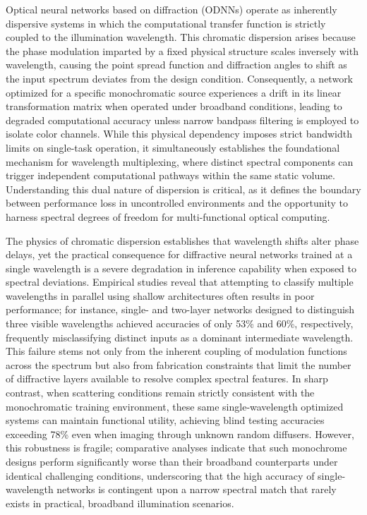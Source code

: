 Optical neural networks based on diffraction (ODNNs) operate as inherently dispersive systems in which the computational transfer function is strictly coupled to the illumination wavelength. This chromatic dispersion arises because the phase modulation imparted by a fixed physical structure scales inversely with wavelength, causing the point spread function and diffraction angles to shift as the input spectrum deviates from the design condition. \citep{doi_10_1117_1_oe_65_5_058106_f60e3d89} Consequently, a network optimized for a specific monochromatic source experiences a drift in its linear transformation matrix when operated under broadband conditions, leading to degraded computational accuracy unless narrow bandpass filtering is employed to isolate color channels. While this physical dependency imposes strict bandwidth limits on single-task operation, it simultaneously establishes the foundational mechanism for wavelength multiplexing, where distinct spectral components can trigger independent computational pathways within the same static volume. Understanding this dual nature of dispersion is critical, as it defines the boundary between performance loss in uncontrolled environments and the opportunity to harness spectral degrees of freedom for multi-functional optical computing. \citep{doi_10_1038_s41598_018_30619_y_5f5bfb09} \citep{doi_10_3390_nano14221812_4d7d91b1} \citep{doi_10_1109_icton67126_2025_11125227_383c0a4a}

The physics of chromatic dispersion establishes that wavelength shifts alter phase delays, yet the practical consequence for diffractive neural networks trained at a single wavelength is a severe degradation in inference capability when exposed to spectral deviations. Empirical studies reveal that attempting to classify multiple wavelengths in parallel using shallow architectures often results in poor performance; for instance, single- and two-layer networks designed to distinguish three visible wavelengths achieved accuracies of only 53\% and 60\%, respectively, frequently misclassifying distinct inputs as a dominant intermediate wavelength. This failure stems not only from the inherent coupling of modulation functions across the spectrum but also from fabrication constraints that limit the number of diffractive layers available to resolve complex spectral features. In sharp contrast, when scattering conditions remain strictly consistent with the monochromatic training environment, these same single-wavelength optimized systems can maintain functional utility, achieving blind testing accuracies exceeding 78\% even when imaging through unknown random diffusers. However, this robustness is fragile; comparative analyses indicate that such monochrome designs perform significantly worse than their broadband counterparts under identical challenging conditions, underscoring that the high accuracy of single-wavelength networks is contingent upon a narrow spectral match that rarely exists in practical, broadband illumination scenarios. \citep{doi_10_1002_adpr_202300310_6647aa64} \citep{doi_10_1038_s41377_023_01116_3_aba67a18}

